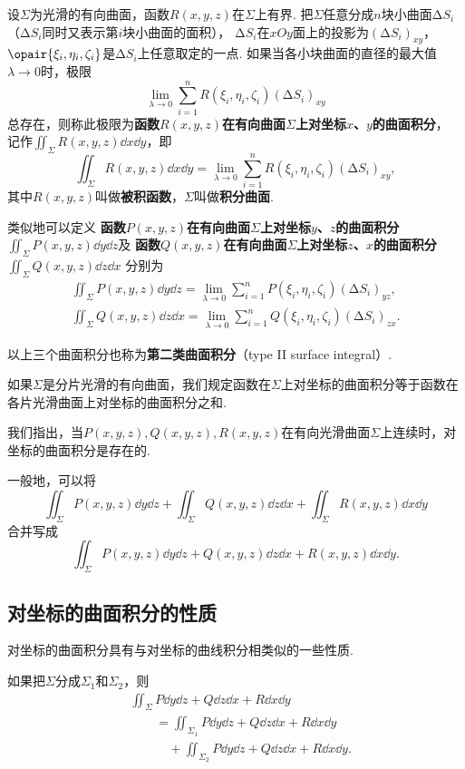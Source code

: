 \begin{definition}
设\(\Sigma\)为光滑的有向曲面，函数\(R(x,y,z)\)在\(\Sigma\)上有界.
把\(\Sigma\)任意分成\(n\)块小曲面\(\increment S_i\)%
（\(\increment S_i\)同时又表示第\(i\)块小曲面的面积），%
\(\increment S_i\)在\(xOy\)面上的投影为\((\increment S_i)_{xy}\)，%
\(\opair{\xi_i,\eta_i,\zeta_i}\)是\(\increment S_i\)上任意取定的一点.
如果当各小块曲面的直径的最大值\(\lambda\to0\)时，极限\[
\lim\limits_{\lambda\to0} \sum\limits_{i=1}^n R(\xi_i,\eta_i,\zeta_i) (\increment S_i)_{xy}
\]总存在，则称此极限为\textbf{函数\(R(x,y,z)\)在有向曲面\(\Sigma\)上对坐标\(x\)、\(y\)的曲面积分}，%
记作\(\iint_{\Sigma} R(x,y,z) \dd{x}\dd{y}\)，即\[
\iint_{\Sigma} R(x,y,z) \dd{x}\dd{y}
=\lim\limits_{\lambda\to0} \sum\limits_{i=1}^n R(\xi_i,\eta_i,\zeta_i) (\increment S_i)_{xy},
\]其中\(R(x,y,z)\)叫做\textbf{被积函数}，\(\Sigma\)叫做\textbf{积分曲面}.

类似地可以定义%
\textbf{函数\(P(x,y,z)\)在有向曲面\(\Sigma\)上对坐标\(y\)、\(z\)的曲面积分\(\iint_{\Sigma} P(x,y,z) \dd{y}\dd{z}\)}及%
\textbf{函数\(Q(x,y,z)\)在有向曲面\(\Sigma\)上对坐标\(z\)、\(x\)的曲面积分\(\iint_{\Sigma} Q(x,y,z) \dd{z}\dd{x}\)}%
分别为\begin{gather*}
\iint_{\Sigma} P(x,y,z) \dd{y}\dd{z}
=\lim\limits_{\lambda\to0} \sum\limits_{i=1}^n P(\xi_i,\eta_i,\zeta_i) (\increment S_i)_{yz}, \\
\iint_{\Sigma} Q(x,y,z) \dd{z}\dd{x}
=\lim\limits_{\lambda\to0} \sum\limits_{i=1}^n Q(\xi_i,\eta_i,\zeta_i) (\increment S_i)_{zx}.
\end{gather*}

以上三个曲面积分也称为\textbf{第二类曲面积分}（type II surface integral）.

如果\(\Sigma\)是分片光滑的有向曲面，我们规定函数在\(\Sigma\)上对坐标的曲面积分等于函数在各片光滑曲面上对坐标的曲面积分之和.
\end{definition}

我们指出，当\(P(x,y,z),Q(x,y,z),R(x,y,z)\)在有向光滑曲面\(\Sigma\)上连续时，对坐标的曲面积分是存在的.

一般地，可以将\[
\iint_{\Sigma} P(x,y,z) \dd{y}\dd{z}
+\iint_{\Sigma} Q(x,y,z) \dd{z}\dd{x}
+\iint_{\Sigma} R(x,y,z) \dd{x}\dd{y}
\]合并写成\[
\iint_{\Sigma}{P(x,y,z)\dd{y}\dd{z}+Q(x,y,z)\dd{z}\dd{x}+R(x,y,z)\dd{x}\dd{y}}.
\]

\subsection{对坐标的曲面积分的性质}
对坐标的曲面积分具有与对坐标的曲线积分相类似的一些性质.
\begin{property}
如果把\(\Sigma\)分成\(\Sigma_1\)和\(\Sigma_2\)，则\begin{align*}
&\iint_{\Sigma}{P\dd{y}\dd{z}+Q\dd{z}\dd{x}+R\dd{x}\dd{y}} \\
&\qquad=\iint_{\Sigma_1}{P\dd{y}\dd{z}+Q\dd{z}\dd{x}+R\dd{x}\dd{y}} \\
&\qquad\quad+\iint_{\Sigma_2}{P\dd{y}\dd{z}+Q\dd{z}\dd{x}+R\dd{x}\dd{y}}.
\end{align*}
\end{property}

